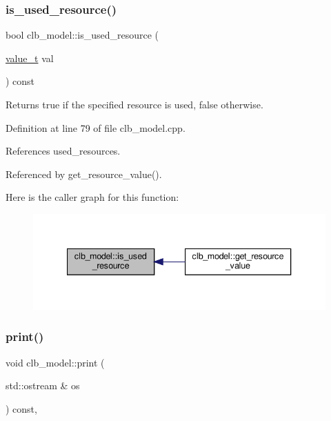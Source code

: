 \mbox{\label{classclb__model_a9510accc931b043ffd9903f39c9c33cf}} 
\subsubsection{\texorpdfstring{is\+\_\+used\+\_\+resource()}{is\_used\_resource()}}
{\footnotesize\ttfamily bool clb\+\_\+model\+::is\+\_\+used\+\_\+resource (\begin{DoxyParamCaption}\item[{\hyperlink{classclb__model_a11a81df139e5752535807c276badbe21}{value\+\_\+t}}]{val }\end{DoxyParamCaption}) const}



Returns true if the specified resource is used, false otherwise. 



Definition at line 79 of file clb\+\_\+model.\+cpp.



References used\+\_\+resources.



Referenced by get\+\_\+resource\+\_\+value().

Here is the caller graph for this function\+:
\nopagebreak
\begin{figure}[H]
\begin{center}
\leavevmode
\includegraphics[width=340pt]{d6/d39/classclb__model_a9510accc931b043ffd9903f39c9c33cf_icgraph}
\end{center}
\end{figure}
\mbox{\label{classclb__model_ab65361824b8e850bc109193b5aab23c5}} 
\subsubsection{\texorpdfstring{print()}{print()}}
{\footnotesize\ttfamily void clb\+\_\+model\+::print (\begin{DoxyParamCaption}\item[{std\+::ostream \&}]{os }\end{DoxyParamCaption}) const\hspace{0.3cm}{\ttfamily [override]}, {\ttfamily [virtual]}}



